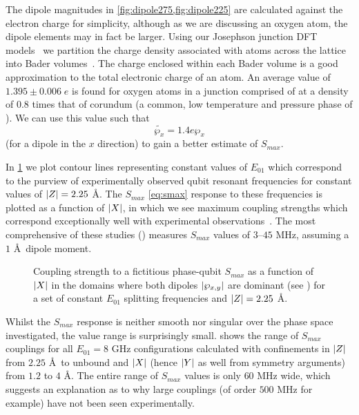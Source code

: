 The dipole magnitudes in \cref{fig:dipole275,fig:dipole225} are calculated against the electron charge for simplicity, although as we are discussing an oxygen atom, the dipole elements may in fact be larger.
Using our Josephson junction DFT models~\cite{DuBois2013} we partition the charge density associated with atoms across the lattice into Bader volumes~\cite{Tang2009}.
The charge enclosed within each Bader volume is a good approximation to the total electronic charge of an atom.
An average value of $1.395\pm0.006 \; e$ is found for oxygen atoms in a junction comprised of  at a density of 0.8 times that of corundum (a common, low temperature and pressure phase of ). We can use this value such that
\begin{equation}
\widetilde{\wp_x} = 1.4e\wp_x
\end{equation}
(for a dipole in the $x$ direction) to gain a better estimate of $S_{max}$.

In \cref{fig:smax225} we plot contour lines representing constant values of $E_{01}$ which correspond to the purview of experimentally observed qubit resonant frequencies for constant values of $\lvert Z\rvert = 2.25$ \AA.
The $S_{max}$ \cref{eq:smax} response to these frequencies is plotted as a function of $\lvert X\rvert$, in which we see maximum coupling strengths which correspond exceptionally well with experimental observations~\cite{Lupascu2009, Shalibo2010, Cole2010}.
The most comprehensive of these studies () measures $S_{max}$ values of $3$--$45$ MHz, assuming a $1$ \AA\ dipole moment.

\begin{figure}[htp]
\resizebox{0.9\textwidth}{!}{}
\caption[$S_{max}$ Couplings]{\label{fig:smax225}Coupling strength to a fictitious phase-qubit $S_{max}$ as a function of $\lvert X\rvert$ in the domains where both dipoles $\lvert\wp_{x,y}\rvert$ are dominant (see ) for a set of constant $E_{01}$ splitting frequencies and $\lvert Z\rvert = 2.25$ \AA.}
\end{figure}

Whilst the $S_{max}$ response is neither smooth nor singular over the phase space investigated, the value range is surprisingly small.
 shows the range of $S_{max}$ couplings for all $E_{01}=8$ GHz configurations calculated with confinements in $\lvert Z\rvert$ from $2.25$ \AA\ to unbound and $\lvert X\rvert$ (hence $\lvert Y\rvert$ as well from symmetry arguments) from $1.2$ to $4$ \AA.
The entire range of $S_{max}$ values is only $60$ MHz wide, which suggests an explanation as to why large couplings (of order $500$ MHz for example) have not been seen experimentally.

